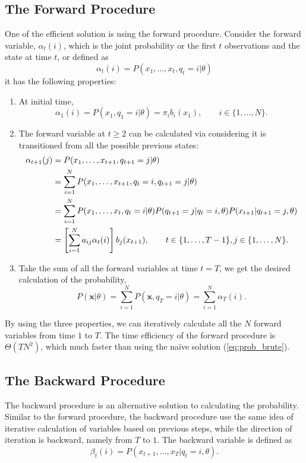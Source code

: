 \documentclass[12pt,final,twoside]{report}
\theoremstyle{plain}
\theoremstyle{definition}
\theoremstyle{remark}
\begin{document}
\subsection{The Forward Procedure}
One of the efficient solution is using the forward procedure. Consider the forward variable, $\alpha_t(i)$, which is the joint probability or the first $t$ observations and the state at time $t$, or defined as
\begin{equation}
  \alpha_t(i) = P(x_1,\dots,x_t,q_t=i|\theta) 
\end{equation}
it has the following properties:
\begin{enumerate}
  \item At initial time,
    \begin{equation}
      \alpha_1(i) = P(x_1,q_1=i|\theta) = \pi_i b_i(x_1), \qquad i \in \{1,\dots,N\} .
    \end{equation}
  \item The forward variable at $t \geq 2$ can be calculated via considering it is transitioned from all the possible previous states:
    \begin{align}
      \alpha_{t+1}(j) &= P(x_1,\dots,x_{t+1},q_{t+1}=j|\theta) \notag\\
      &= \sum_{i=1}^{N} P(x_1,\dots,x_{t+1},q_t=i,q_{t+1}=j|\theta) \notag\\
      &= \sum_{i=1}^{N} P(x_1,\dots,x_t,q_t=i|\theta) P(q_{t+1}=j|q_t=i,\theta) P(x_{t+1}|q_{t+1}=j,\theta) \notag\\
      &= \left[ \sum_{i=1}^{N} a_{ij} \alpha_t(i) \right] b_j(x_{t+1}), \qquad t \in \{1,\dots,T - 1\}, j \in \{1,\dots,N\} .
    \end{align}
  \item Take the sum of all the forward variables at time $t = T$, we get the desired calculation of the probability,
    \begin{equation}
      P(\mathbf{x}|\theta) = \sum_{i=1}^N P(\mathbf{x},q_T=i|\theta) = \sum_{i=1}^N \alpha_T(i) .
    \end{equation}
\end{enumerate}

By using the three properties, we can iteratively calculate all the $N$ forward variables from time $1$ to $T$. The time efficiency of the forward procedure is $\Theta(TN^2)$, which much faster than using the na\"ive solution (\cref{eq:prob_brute}).

\subsection{The Backward Procedure}
The backward procedure is an alternative solution to calculating the probability. Similar to the forward procedure, the backward procedure use the same idea of iterative calculation of variables based on previous steps, while the direction of iteration is backward, namely from $T$ to $1$. The backward variable is defined as
\begin{equation}
  \beta_t(i) = P(x_{t+1},\dots,x_T|q_t=i,\theta) .
\end{equation}
\end{document}
